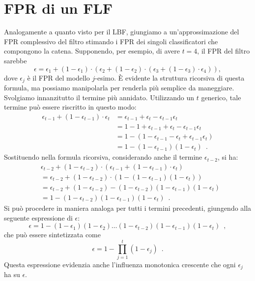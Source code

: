 \section{FPR di un FLF}
\label{par:fpr-flf}
Analogamente a quanto visto per il LBF, giungiamo a un'approssimazione del FPR complessivo del filtro stimando i FPR dei singoli classificatori che compongono la catena. Supponendo, per esempio, di avere $t=4$, il FPR del filtro sarebbe
\begin{equation}
    \epsilon = \epsilon_1 + (1 - \epsilon_1) \cdot (\epsilon_2 + (1 - \epsilon_2) \cdot (\epsilon_3 + (1 - \epsilon_3) \cdot \epsilon_4 ) ),
    \label{expr:fpr-ricorsivo}
\end{equation}
dove $\epsilon_j$ è il FPR del modello $j$-esimo. È evidente la struttura ricorsiva di questa formula, ma possiamo manipolarla per renderla più semplice da maneggiare.
Svolgiamo innanzitutto il termine più annidato. Utilizzando un $t$ generico, tale termine può essere riscritto in questo modo:
\begin{equation}
    \begin{aligned}
        \epsilon_{t-1} + (1 - \epsilon_{t-1}) \cdot \epsilon_t &= \epsilon_{t-1} + \epsilon_{t} - \epsilon_{t-1} \epsilon_{t} \\
        &= 1 - 1 + \epsilon_{t-1} + \epsilon_{t} - \epsilon_{t-1} \epsilon_{t} \\
        &= 1 - (1 - \epsilon_{t-1} - \epsilon_{t} + \epsilon_{t-1} \epsilon_{t}) \\
        &= 1 - (1-\epsilon_{t-1})(1-\epsilon_{t}) \enspace.
    \end{aligned}
\end{equation}
Sostituendo nella formula ricorsiva, considerando anche il termine $\epsilon_{t-2}$, si ha:
\begin{equation}
    \begin{aligned}&
        \epsilon_{t-2} + (1 - \epsilon_{t-2}) \cdot (\epsilon_{t-1} + (1 - \epsilon_{t-1}) \cdot \epsilon_{t} ) \\
        &=\epsilon_{t-2} + (1 - \epsilon_{t-2}) \cdot (1 - (1-\epsilon_{t-1})(1-\epsilon_{t})) \\
        &= \epsilon_{t-2} + (1 - \epsilon_{t-2}) - (1 - \epsilon_{t-2})(1 - \epsilon_{t-1})(1 - \epsilon_{t}) \\
        &= 1 - (1 - \epsilon_{t-2})(1 - \epsilon_{t-1})(1 - \epsilon_{t}) \enspace.
    \end{aligned}
\end{equation}
Si può procedere in maniera analoga per tutti i termini precedenti, giungendo alla seguente espressione di $\epsilon$:
\begin{equation}
    \epsilon = 1- (1-\epsilon_{1})(1-\epsilon_{2}) \dots (1 - \epsilon_{t-2})(1 - \epsilon_{t-1})(1 - \epsilon_{t}) \enspace ,
\end{equation}
che può essere sintetizzata come
\begin{equation}
    \epsilon = 1- \prod_{j=1}^t (1-\epsilon_j) \enspace .
    \label{expr:fpr-prod}
\end{equation}
Questa espressione evidenzia anche l'influenza monotonica crescente che ogni $\epsilon_j$ ha su $\epsilon$.

